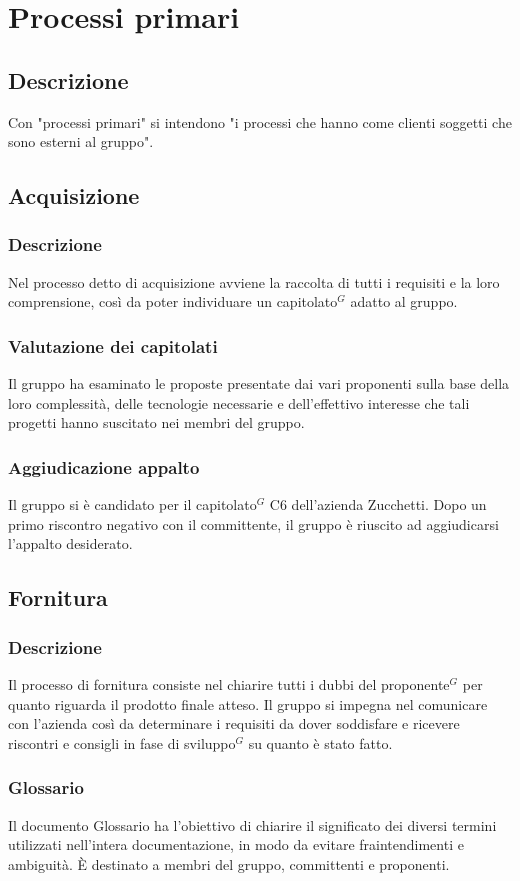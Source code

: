 \documentclass[a4paper,10pt]{article}
\begin{document}
\section{Processi primari}
\subsection{Descrizione}
Con "processi primari" si intendono "i processi che hanno come clienti soggetti che sono esterni al gruppo".

\subsection{Acquisizione}
\subsubsection{Descrizione}
Nel processo detto di acquisizione avviene la raccolta di tutti i requisiti e la loro comprensione, così da poter 
individuare un capitolato$^G$ adatto al gruppo.
\subsubsection{Valutazione dei capitolati}
Il gruppo ha esaminato le proposte presentate dai vari proponenti sulla base della loro complessità,
delle tecnologie necessarie e dell’effettivo interesse che tali progetti hanno suscitato nei membri del gruppo.
\subsubsection{Aggiudicazione appalto}
Il gruppo si è candidato per il capitolato$^G$ C6 dell'azienda Zucchetti. Dopo un primo riscontro negativo con il committente,
il gruppo è riuscito ad aggiudicarsi l'appalto desiderato.

\subsection{Fornitura}
\subsubsection{Descrizione}
Il processo di fornitura consiste nel chiarire tutti i dubbi del proponente$^G$ per quanto riguarda il prodotto finale atteso.
Il gruppo si impegna nel comunicare con l'azienda così da determinare i requisiti da dover soddisfare e ricevere riscontri
e consigli in fase di sviluppo$^G$ su quanto è stato fatto. 
\subsubsection{Glossario}
Il documento Glossario ha l'obiettivo di chiarire il significato dei diversi termini utilizzati nell'intera documentazione,
in modo da evitare fraintendimenti e ambiguità. È destinato a membri del gruppo, committenti e proponenti.
\end{document}
